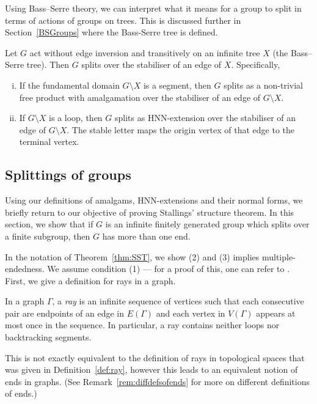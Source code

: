 Using Bass--Serre theory, we can interpret what it means for a group to split in terms of actions of groups on trees. This is discussed further in Section~\ref{BSGroups} where the Bass-Serre tree is defined.

\begin{theorem}
\label{thm:bassserre}
     Let \(G\) act without edge inversion and transitively on an infinite tree \(X\) (the Bass--Serre tree). Then \(G\) splits over the stabiliser of an edge of \(X\). Specifically,
\begin{enumerate}[(i)]
    \item If the fundamental domain \(G \setminus X\) is a segment, then \(G\) splits as a non-trivial free product with amalgamation over the stabiliser of an edge of \(G \setminus X\). 
    \item If \(G \setminus X\) is a loop, then \(G\) splits as HNN-extension over the stabiliser of an edge of \(G \setminus X\). The stable letter maps the origin vertex of that edge to the terminal vertex.
\end{enumerate}
\end{theorem}

\subsection{Splittings of groups}
  Using our definitions of amalgams, HNN-extensions and their normal forms, we briefly return to our objective of proving Stallings' structure theorem. In this section, we show that if \(G\) is an infinite finitely generated group which splits over a finite subgroup, then \(G\) has more than one end. 
  
  In the notation of Theorem~\ref{thm:SST}, we show (2) and (3) implies multiple-endedness. We assume condition (1) --- for a proof of this, one can refer to \cite[Chapter 11.6, Corollary 11.34]{M08}. First, we give a definition for rays in a graph.

\begin{definition}
    In a graph \(\Gamma\), a \emph{ray} is an infinite sequence of vertices such that each consecutive pair are endpoints of an edge in \(E(\Gamma)\) and each vertex in \(V(\Gamma)\) appears at most once in the sequence. In particular, a ray contains neither loops nor backtracking segments.
\end{definition}

\begin{caveat}
    This is not exactly equivalent to the definition of rays in topological spaces that was given in Definition~\ref{def:ray}, however this leads to an equivalent notion of ends in graphs. (See Remark~\ref{rem:diffdefsofends} for more on different definitions of ends.)
\end{caveat}
  
